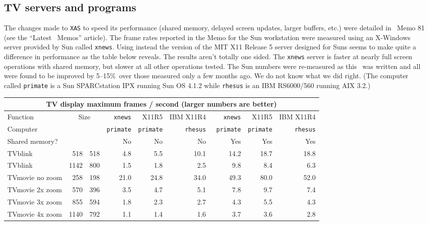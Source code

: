 \subsection{TV servers and programs}

The changes made to {\tt XAS} to speed its performance (shared memory,
delayed screen updates, larger buffers, etc.) were detailed in \AIPS\
Memo 81 (see the ``Latest \AIPS\ Memos'' article).  The frame rates
reported in the Memo for the Sun workstation were measured using an
X-Windows server provided by Sun called {\tt xnews}.  Using instead
the version of the MIT X11 Release 5 server designed for Suns seems to
make quite a difference in performance as the table below reveals.
The results aren't totally one sided.  The {\tt xnews} server is
faster at nearly full screen operations with shared memory, but slower
at all other operations tested.  The Sun numbers were re-measured as
this \AIPSLETTER\ was written and all were found to be improved by
5--15\%\ over those measured only a few months ago.  We do not know
what we did right.  (The computer called {\tt primate} is a Sun
SPARCstation IPX running Sun OS 4.1.2 while {\tt rhesus} is an IBM
RS6000/560 running AIX 3.2.)

\begin{center}
\begin{tabular}{lrrrrrrrr}
\multicolumn{9}{c}{TV display maximum frames / second \hfill (larger
                     numbers are better)}\\
\hline
Function&\multicolumn{2}{c}{Size}&{\tt xnews}&X11R5& IBM X11R4 &
{\tt xnews}& X11R5& IBM X11R4 \\
Computer      &    &    &{\tt primate}&{\tt primate}&{\tt rhesus}&{\tt
                                primate}&{\tt primate}&{\tt rhesus}\\
Shared memory?&    &    &No  &No   &No  &Yes  &Yes &Yes\\
\hline
TVblink        & 518& 518&  4.8&  5.5& 10.1& 14.2& 18.7& 18.8\\
TVblink        &1142& 800&  1.5&  1.8&  2.5&  9.8&  8.4&  6.3\\
TVmovie no zoom& 258& 198& 21.0& 24.8& 34.0& 49.3& 80.0& 52.0\\
TVmovie 2x zoom& 570& 396&  3.5&  4.7&  5.1&  7.8&  9.7&  7.4\\
TVmovie 3x zoom& 855& 594&  1.8&  2.3&  2.7&  4.3&  5.5&  4.3\\
TVmovie 4x zoom&1140& 792&  1.1&  1.4&  1.6&  3.7&  3.6&  2.8\\
\hline
\end{tabular}
\end{center}

